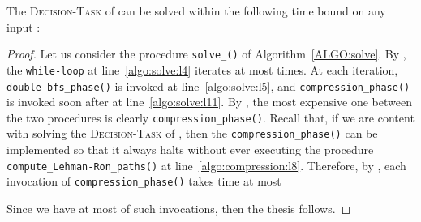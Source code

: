 \begin{proposition}\label{prop:complexity_solve_decision}
The \textsc{Decision-Task} of {\mainproblem} can be solved within the following time bound
on any input :

\end{proposition}
\begin{proof}
Let us consider the procedure \texttt{solve\_\mainproblem()} of Algorithm~\ref{ALGO:solve}.
By , the \texttt{while-loop} at line~\ref{algo:solve:l4} iterates at most  times.
At each iteration, \texttt{double-bfs\_phase()} is invoked at line~\ref{algo:solve:l5},
and \texttt{compression\_phase()} is invoked soon after at line~\ref{algo:solve:l11}.
By , the most expensive one between the two procedures is clearly \texttt{compression\_phase()}.
Recall that, if we are content with solving the \textsc{Decision-Task} of {\mainproblem},
then the \texttt{compression\_phase()} can be implemented so that it always halts without
ever executing the  procedure \texttt{compute\_Lehman-Ron\_paths()} at line~\ref{algo:compression:l8}.
Therefore, by ,
each invocation of \texttt{compression\_phase()} takes time at most

Since we have at most  of such invocations, then the thesis follows.
\end{proof}

